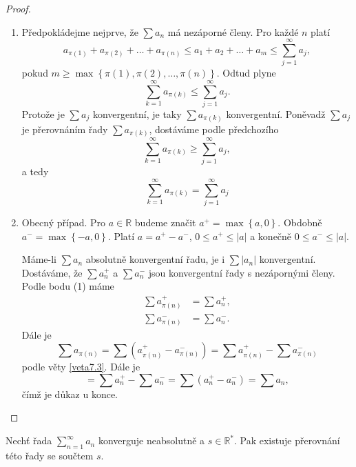 \begin{proof}\,
\begin{enumerate}[(1)]
	\item Předpokládejme nejprve, že $\sum a_n$ má nezáporné členy.
	Pro každé $n$ platí
	$$
	    a_{\pi(1)}+a_{\pi(2)} + \dots + a_{\pi(n)} \leq a_1 + a_2 + \dots +a_m \leq \sum_{j=1}^\infty a_j,
	$$
	pokud $m \geq \max \left \{ \pi(1), \pi(2), \dots, \pi(n) \right \} $. Odtud plyne
	$$
	    \sum_{k=1}^\infty a_{\pi(k)} \leq \sum_{j=1}^\infty a_j.
	$$
	Protože je $\sum a_j$ konvergentní, je taky $\sum a_{\pi(k)}$ konvergentní. Poněvadž
	$\sum a_j$ je přerovnáním řady $\sum a_{\pi(k)}$, dostáváme podle předchozího
	$$
	\sum_{k=1}^\infty a_{\pi(k)} \geq \sum_{j=1}^\infty a_j,
	$$
	a tedy
	$$
	    \sum_{k=1}^\infty a_{\pi(k)} = \sum_{j=1}^\infty a_j
	$$
	\item Obecný případ. Pro $a \in \mathbb R $ budeme značit $a^+ = \max \left \{ a,0 \right \} $.
	Obdobně $a^- = \max \left \{ -a, 0 \right \} $. Platí $a=a^+-a^-$, $0\leq a^+\leq |a|$ a konečně
	$0\leq a^-\leq |a|$.
	\par Máme-li $\sum a_n$ absolutně konvergentní řadu, je i $\sum |a_n|$ konvergentní.
	Dostáváme, že $\sum a_n^+$ a $\sum a_n^-$ jsou konvergentní řady s nezápornými členy.
	Podle bodu (1) máme
	\begin{align*}
	\sum a_{\pi(n)}^+ &= \sum a_n^+,\\
	\sum a_{\pi(n)}^- &= \sum a_n^-.
\end{align*}
Dále je
$$
    \sum a_{\pi(n)} = \sum  (a_{\pi(n)}^+ - a_{\pi(n)}^-) = \sum a_{\pi(n)}^+ - \sum a_{\pi(n)}^-
$$
podle věty \ref{veta7.3}. Dále je
$$
    = \sum a_n^+ - \sum a_n^- = \sum (a_n^+ - a_n^-) = \sum a_n,
$$
čímž je důkaz u konce. \qedhere
\end{enumerate}
\end{proof}

\begin{veta}[Riemann] \label{veta7.14}
Nechť řada $\sum_{n=1}^{\infty} a_n$ konverguje neabsolutně a $s \in \mathbb{R}^*$. Pak existuje přerovnání této řady se součtem $s$.
\end{veta}

